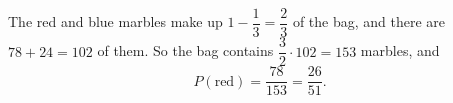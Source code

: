 The red and blue marbles make up $1-\dfrac{1}{3}=\dfrac{2}{3}$ of the bag, and there are $78+24=102$ of them. So the bag contains $\dfrac{3}{2}\cdot102=153$ marbles, and
\[P(\text{red})=\dfrac{78}{153}=\boxed{\dfrac{26}{51}}.\]
